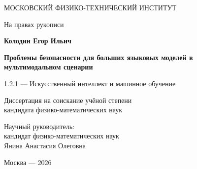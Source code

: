 \thispagestyle{empty}

\begin{center}
    \MakeUppercase{Московский физико-технический институт}
\end{center}

\vspace{2em}
\begin{flushright}
    \begin{minipage}{0.5\textwidth}
        \raggedleft На правах рукописи
    \end{minipage}
\end{flushright}

\vspace{5em}
\begin{center}
    {\large\bfseries Колодин Егор Ильич}

    \vspace{3.5em}
    {\large\bfseries Проблемы безопасности для больших языковых моделей в мультимодальном сценарии}

    \vspace{3em}
    1.2.1 --- Искусственный интеллект и машинное обучение

    \vspace{3em}
    Диссертация на соискание учёной степени\\
    кандидата физико-математических наук
\end{center}

\vspace{3.5em}
\begin{flushright}
    \begin{minipage}{0.6\textwidth}
        \raggedright
        Научный руководитель:\\
        кандидат физико-математических наук\\
        Янина Анастасия Олеговна
    \end{minipage}
\end{flushright}

\vfill
\begin{center}
    Москва --- 2026
\end{center}
\clearpage
